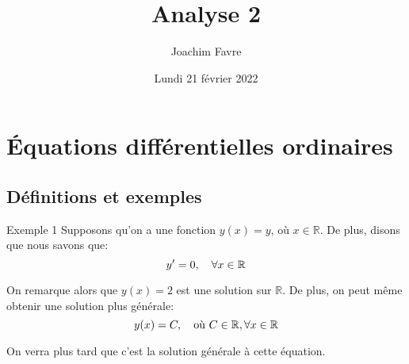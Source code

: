 \documentclass[a4paper]{article}
\title{Analyse 2}
\author{Joachim Favre}
\date{Lundi 21 février 2022}
\begin{document}
\maketitle


\section{Équations différentielles ordinaires}
\subsection{Définitions et exemples}
\begin{parag}{Exemple 1}
    Supposons qu'on a une fonction $y\left(x\right) = y$, où $x \in \mathbb{R}$. De plus, disons que nous savons que: 
    \[y' = 0, \quad \forall x \in \mathbb{R}\]
    
    On remarque alors que $y\left(x\right) = 2$ est une solution sur $\mathbb{R}$. De plus, on peut même obtenir une solution plus générale:
    \[y\left(x\right) = C, \mathspace \text{où } C \in \mathbb{R}, \forall x \in \mathbb{R}\]
    
    On verra plus tard que c'est la solution générale à cette équation.
\end{parag}
\end{document}
